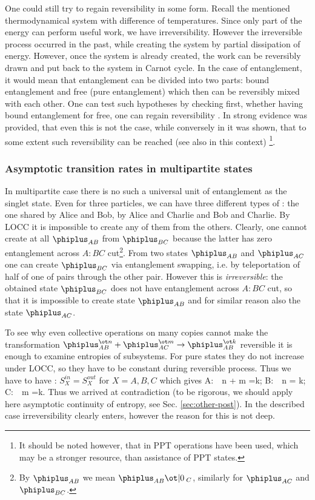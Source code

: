 \documentclass[rmp,12pt,preprint]{revtex4-2}
\begin{document}
One could still try to regain reversibility in some form. Recall the
mentioned thermodynamical system with difference of temperatures.
Since only part of the energy can perform useful work, we have
irreversibility. However the irreversible process occurred in the
past, while creating the system by partial dissipation of energy.
However, once the system is already created, the work can be
reversibly drawn and put back to the system in Carnot cycle. In the
case of entanglement, it would mean that entanglement can be divided
into two parts: bound entanglement and free (pure entanglement)
which then can be reversibly mixed with each other. One can test
such hypotheses by checking first, whether having bound entanglement
for free, one can regain reversibility \cite{bound}. In
\cite{thermo-ent2002} strong evidence was provided, that even this
is not the case, while conversely in \cite{AudenaertPE2002-PPT} it
was shown, that to some extent such reversibility can be reached
(see also \cite{Ishizaka04} in this context)
\footnote{It should be noted however, that in \cite{AudenaertPE2002-PPT}
PPT operations have been used, which may be a stronger resource,
than assistance of PPT states.}.


\subsubsection{Asymptotic transition rates in multipartite states}
\label{subsubsec:ghz-epr}
In multipartite case there is no such a universal unit of entanglement as the singlet state.
Even for three particles, we can have three different types of \eprstates:
the one  shared by Alice and Bob, by Alice and Charlie
and Bob and Charlie. By LOCC it is impossible to
create any of them from the others.
Clearly, one cannot create at all $\phiplus_{AB}$ from $\phiplus_{BC}$
because the latter has zero entanglement across $A:BC$ cut\footnote{By $\phiplus_{AB}$
we mean $\phiplus_{AB}\ot |0\>_C$, similarly for $\phiplus_{AC}$ and $\phiplus_{BC}$.}.
From two states $\phiplus_{AB}$ and $\phiplus_{AC}$ one can create
$\phiplus_{BC}$ via entanglement swapping, i.e. by teleportation of half
of one of pairs through the other pair. However this is {\it
irreversible}: the obtained state $\phiplus_{BC}$ does not have
entanglement across $A:BC$ cut, so that it is impossible to create
state $\phiplus_{AB}$ and for similar reason also the state $\phiplus_{AC}$.

To see why even collective operations on many copies cannot make the
transformation $\phiplus_{AB}^{\ot n} + \phiplus_{AC}^{\ot m} \to
\phiplus_{AB}^{\ot k}$ reversible it is enough to examine entropies of
subsystems. For pure states they do not increase under LOCC, so they
have to be constant during reversible process. Thus we have to have
: $S_X^{in} = S_X^{out}$  for $X=A,B,C$ which gives \be A: \,\, n +
m =k; \quad B: \,\, n = k; \quad C: \,\, m =k. \quad \ee Thus we
arrived at contradiction (to be rigorous, we should apply here
asymptotic continuity of entropy, see Sec. \ref{sec:other-post}). In the
described case irreversibility clearly enters, however the reason
for this is not deep.
\end{document}
